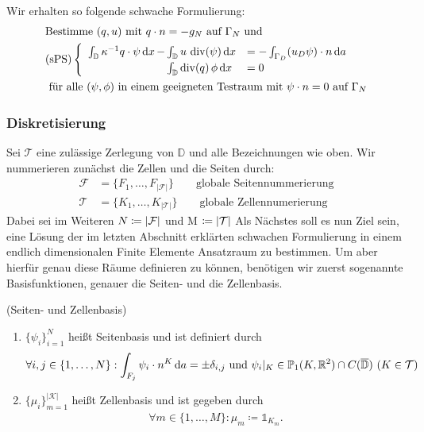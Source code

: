 Wir erhalten so folgende schwache Formulierung:
\label{sPS}
\begin{align*}
&\text{Bestimme } (q,u) \text{ mit } q\cdot n = -g_N \text{ auf } \Gamma_N \text{ und}\\
&\text{(sPS)}\begin{cases}
\begin{array}{llll}
\int_{\mathbb{D}} \kappa^{-1} q \cdot \psi \, \mathrm{d} x \, - \mkern-15mu &\int_{\mathbb{D}} u \, \operatorname{div}(\psi) \, \mathrm{d} x &= - \int_{\Gamma_D} (u_D \psi) \cdot n \, \mathrm{d} a\\
&\int_{\mathbb{D}} \operatorname{div}(q) \, \phi \, \mathrm{d} x &= 0
\end{array}
\end{cases}	\\
&\text{ für alle } (\psi, \phi) \text{ in einem geeigneten Testraum mit } \psi \cdot n = 0 \text{ auf } \Gamma_N 
\end{align*}

\subsubsection{Diskretisierung}
Sei $ \mathcal{T}  $ eine zulässige Zerlegung von $ \mathbb{D} $ und alle Bezeichnungen wie oben.
Wir nummerieren zunächst die Zellen und die Seiten durch:
\begin{align*}
	\mathcal{F} &= \{ F_1,\dots,F_{|\mathcal{F}|}\} \qquad \text{globale Seitennummerierung} \\
	\mathcal{T} &=  \{ K_1,\dots,K_{|\mathcal{T}|}\} \qquad \text{globale Zellennumerierung}
\end{align*}
Dabei sei im Weiteren $ N \coloneqq | \mathcal{F} | $ und M $\coloneqq | \mathcal{T} |$
Als Nächstes soll es nun Ziel sein, eine Lösung der im letzten Abschnitt erklärten schwachen Formulierung in einem endlich dimensionalen Finite Elemente Ansatzraum zu bestimmen. Um aber hierfür genau diese Räume definieren zu können, benötigen wir zuerst sogenannte Basisfunktionen, genauer die Seiten- und die Zellenbasis.\\

 \begin{Definition}(Seiten- und Zellenbasis) 
	\begin{enumerate}[label=(\alph*)]
		\item $ \{ \psi_i \}_{i=1}^{N} $ heißt Seitenbasis und ist definiert durch
			\begin{align*}
					\forall i,j \in \{1, \dots , N \} : \int_{F_j} \psi_i \cdot n^K \, \mathrm{d} a = \pm \delta_{i,j} \text{ und }  \psi_i|_K \in \mathbb{P}_1(K,\mathbb{R}^2) \cap C(\overline{\mathbb{D}}) \ (K \in \mathcal{T}) 
			\end{align*} 
		\item $ \{ \mu_i \}_{m=1}^{|\mathcal{K}|} $ heißt Zellenbasis und ist gegeben durch
			\begin{align*}
				\forall m \in \{1, \dots , M \} : \mu_m \coloneqq  \mathds{1}_{K_m}.
			\end{align*}
	\end{enumerate}
\end{Definition} 

